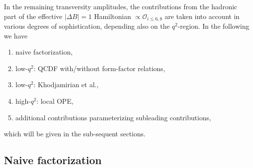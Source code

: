 In the remaining transversity amplitudes, the contributions from the hadronic part
of the effective $|\Delta B|=1$ Hamiltonian $\propto \mathcal{O}_{i\leq 6,8}$ are taken
into account in various degrees of sophistication, depending also on the $q^2$-region.
In the following we have 
\begin{enumerate}
\item naive factorization,
\item low-$q^2$: QCDF with/without form-factor relations,
\item low-$q^2$: Khodjamirian et al.,
\item high-$q^2$: local OPE,
\item additional contributions parameterizing subleading contributions,
\end{enumerate}
which will be given in the sub-sequent sections.

%
\subsection{Naive factorization \label{sec:trAmps:naive}}

